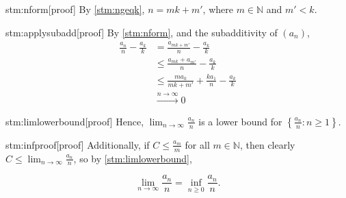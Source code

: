 \documentclass{article}
\begin{document}
\begin{stm}{stm:nform}[proof]
By \ref{stm:ngeqk}, $n = mk + m'$, where $m \in \mathbb{N}$ and $m' < k$.
\end{stm}

\begin{stm}{stm:applysubadd}[proof]
By \ref{stm:nform}, and the subadditivity of $(a_n)$,
\begin{align*}
\frac{a_n}{n} - \frac{a_k}{k} &=\frac{a_{mk + m'}}{n} - \frac{a_k}{k} \\
&\le \frac{a_{mk} + a_{m'}}{n} - \frac{a_k}{k} \\
&\le \frac{ma_k}{mk + m'} + \frac{k a_1}{n} - \frac{a_k}{k} \\
&\xrightarrow{n \to \infty} 0
\end{align*}
\end{stm}

\begin{stm}{stm:limlowerbound}[proof]
Hence, $\lim_{n \to \infty} \frac{a_n}{n}$ is a lower bound for $\left\{ \frac{a_n}{n} : n \ge 1 \right\}$.
\end{stm}

\begin{stm}{stm:infproof}[proof]
Additionally, if $C \le \frac{a_m}{m}$ for all $m \in \mathbb{N}$, then clearly $C \le \lim_{n \to \infty} \frac{a_n}{n}$, so by \ref{stm:limlowerbound},

\[
\lim_{n \to \infty} \frac{a_n}{n} = \inf_{n \ge 0} \frac{a_n}{n}.
\]
\end{stm}
\end{document}
